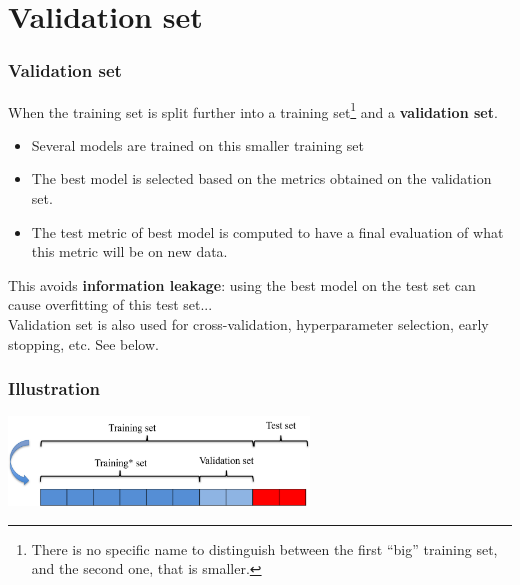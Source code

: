 \section{Validation set}
\begin{frame}
\frametitle{Validation set}
When the training set is split further into a training set\footnote{There is no specific name to distinguish between the first ``big'' training set, and the second one, that is smaller.} and a {\bf validation set}.
\begin{itemize}
\item Several models are trained on this smaller training set
\item The best model is selected based on the metrics obtained on the validation set.
\item The test metric of best model is computed to have a final evaluation of what this metric will be on new data.
\end{itemize}
This avoids {\bf information leakage}: using the best model on the test set can cause overfitting of this test set...\\
\vspace{0.3cm}
Validation set is also used for cross-validation, hyperparameter selection, early stopping, etc. See below.
\end{frame}
\begin{frame}
\frametitle{Illustration}
\begin{center}
\includegraphics[width=8cm]{../Graphs/Validation_set.png}
\end{center}
\end{frame}
